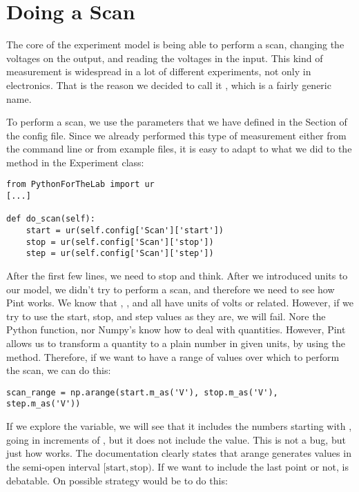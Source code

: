 \section{Doing a Scan}\label{sec:doing-scan}
The core of the experiment model is being able to perform a scan, changing the voltages on the output, and reading the voltages in the input. This kind of measurement is widespread in a lot of different experiments, not only in electronics. That is the reason we decided to call it , which is a fairly generic name.


To perform a scan, we use the parameters that we have defined in the  Section of the config file. Since we already performed this type of measurement either from the command line or from example files, it is easy to adapt to what we did to the method in the Experiment class:

\begin{verbatim}
from PythonForTheLab import ur
[...]

def do_scan(self):
    start = ur(self.config['Scan']['start'])
    stop = ur(self.config['Scan']['stop'])
    step = ur(self.config['Scan']['step'])
\end{verbatim}

After the first few lines, we need to stop and think. After we introduced units to our model, we didn't try to perform a scan, and therefore we need to see how Pint works. We know that , , and  all have units of volts or related. However, if we try to use the start, stop, and step values as they are, we will fail. Nore the Python  function, nor Numpy's  know how to deal with quantities. However, Pint allows us to transform a quantity to a plain number in given units, by using the  method. Therefore, if we want to have a range of values over which to perform the scan, we can do this:

\begin{verbatim}
scan_range = np.arange(start.m_as('V'), stop.m_as('V'), step.m_as('V'))
\end{verbatim}

If we explore the  variable, we will see that it includes the numbers starting with , going in increments of , but it does not include the  value. This is not a bug, but just how  works. The documentation clearly states that arange generates values in the semi-open interval $[\textrm{start}, \textrm{stop})$. If we want to include the last point or not, is debatable. On possible strategy would be to do this:

